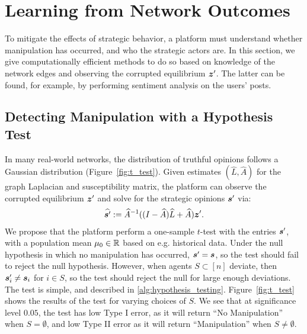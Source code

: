 
\section{Learning from Network Outcomes}\label{sec:learning}


To mitigate the effects of strategic behavior, a platform must understand whether manipulation has occurred, and who the strategic actors are. In this section, we give computationally efficient methods to do so based on knowledge of the network edges and observing the corrupted equilibrium $\bm{z}^\prime$. The latter can be found, for example, by performing sentiment analysis on the users' posts. 


\subsection{Detecting Manipulation with a Hypothesis Test}

In many real-world networks, the distribution of truthful opinions follows a Gaussian distribution (Figure~\ref{fig:t_test}). Given estimates $(\widehat{L}, \widehat{A})$ for the graph Laplacian and susceptibility matrix, the platform can observe the corrupted equilibrium $\bm{z}^\prime$ and solve for the strategic opinions $\bm{s}^\prime$ via: 
\begin{align}
\widehat{\bm{s}^\prime} := \widehat{A}^{-1}((I - \widehat{A})\widehat{L} + \widehat{A}) \bm{z}^\prime. \label{eq:solve_sprime}
\end{align}
We propose that the platform perform a one-sample $t$-test with the entries $\bm{s}^\prime$, with a population mean $\mu_0 \in \mathbb{R}$ based on e.g. historical data. Under the null hypothesis in which no manipulation has occurred, $\bm{s}^\prime = \bm{s}$, so the test should fail to reject the null hypothesis. However, when agents $S \subset [n]$ deviate, then $\bm{s}_i^\prime \neq \bm{s}_i$ for $i \in S$, so the test should reject the null for large enough deviations. The test is simple, and described in \cref{alg:hypothesis_testing}. Figure~\ref{fig:t_test} shows the results of the test for varying choices of $S$. We see that at significance level $0.05$, the test has low Type I error, as it will return ``No Manipulation'' when $S = \emptyset$, and low Type II error as it will return ``Manipulation'' when $S \neq \emptyset$. 



